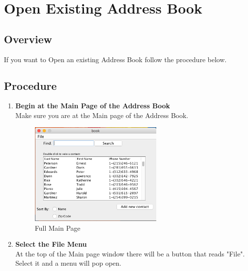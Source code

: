 \documentclass[a4paper, 11pt]{article}
\begin{document}
\clearpage

\section{Open Existing Address Book}
\subsection{Overview}
If you want to Open an existing Address Book follow the procedure below.
\subsection{Procedure}
\begin{enumerate}[label=\textbf{\arabic*})]
    \item{\textbf{Begin at the Main Page of the Address Book}}\\ Make sure you are at the Main page of the Address Book.
    
    \begin{figure}[h!]
    \centering
      \includegraphics[width=250]{main_page_full.png}
      \caption{Full Main Page}
    \end{figure}
    
    \item{\textbf{Select the File Menu}}\\ At the top of the Main page window there will be a button that reads "File". Select it and a menu will pop open.
    

\end{enumerate}
\end{document}
